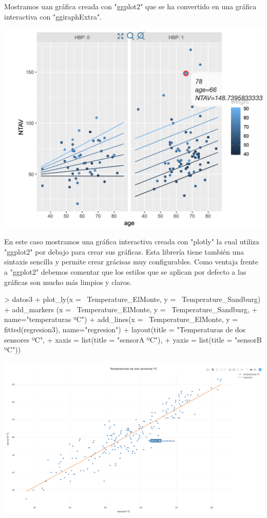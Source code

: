 \documentclass [a4paper] {article}
\begin{document}
Mostramos uan gráfica creada con "ggplot2" que se ha convertido en una gráfica interactiva con "ggiraphExtra".
\begin{center}
  \includegraphics{interactive.png}
\end{center}

En este caso mostramos una gráfica interactiva creada con "plotly" la cual utiliza "ggplot2" por debajo para crear sus gráficas.
Esta librería tiene también una sintaxis sencilla y permite crear grácisas muy configurables.
Como ventaja frente a "ggplot2" debemos comentar que los estilos que se aplican por defecto a las gráficas son mucho más limpios y claros.
\begin{Schunk}
\begin{Sinput}
> datos3 %
+   plot_ly(x = ~Temperature_ElMonte, y = ~Temperature_Sandburg) %
+   add_markers (x = ~Temperature_ElMonte, y = ~Temperature_Sandburg, 
+     name="temperaturas ºC") %
+   add_lines(x = ~Temperature_ElMonte, y = fitted(regresion3), name="regresion")%
+   layout(title = "Temperaturas de dos sensores ºC",
+     xaxis = list(title = "sensorA ºC"),
+     yaxis = list(title = "sensorB ºC"))
\end{Sinput}
\end{Schunk}

\begin{center}
  \includegraphics{interactive2.png}
\end{center}
\end{document}
